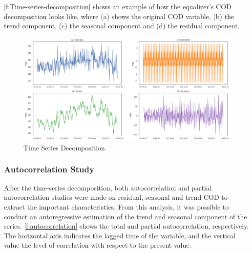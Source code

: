 \autoref{f:Time-series-decomposition} shows an example of how the equalizer’s COD decomposition looks like, where (a) shows the original COD variable, (b) the trend component, (c) the seasonal component and (d) the residual component.

\begin{figure}[h]
\centering
\includegraphics[width=\linewidth]{figures/Ch4/time_series_descompose.pdf}
\caption{Time Series Decomposition}
\label{f:Time-series-decomposition}
\end{figure}

\subsubsection{Autocorrelation Study}
\label{ss:autocorrelation}

After the time-series decomposition, both autocorrelation and partial autocorrelation studies were made on residual, seasonal and trend COD to extract the important characteristics. From this analysis, it was possible to conduct an autoregressive estimation of the trend and seasonal component of the series. \autoref{f:autocorrelation} shows the total and partial autocorrelation, respectively. The horizontal axis indicates the lagged time of the variable, and the vertical value the level of correlation with respect to the present value.

